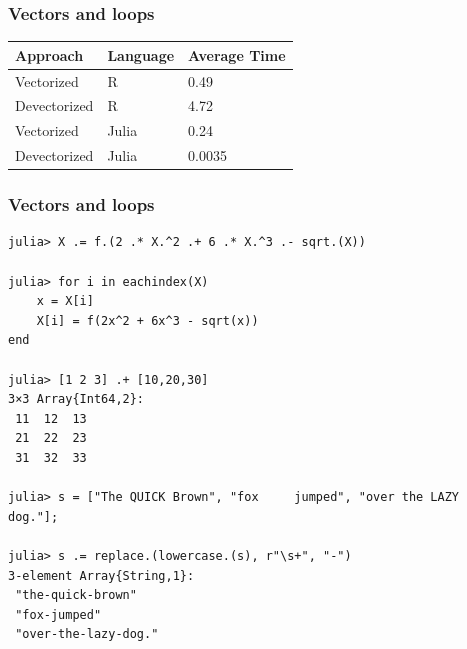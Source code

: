 \begin{frame}[fragile]
	\frametitle{Vectors and loops}
\begin{table}
\small
\begin{tabular}{*{3}{l}}
Approach & Language & Average Time \\
\hline
Vectorized & R & 0.49 \\
Devectorized & R & 4.72 \\
Vectorized & Julia & 0.24 \\
Devectorized & Julia & 0.0035 \\
\end{tabular}
\end{table}
\end{frame}

\begin{frame}[fragile]
	\frametitle{Vectors and loops}
  \begin{tiny}
  \begin{verbatim}
julia> X .= f.(2 .* X.^2 .+ 6 .* X.^3 .- sqrt.(X))

julia> for i in eachindex(X)
    x = X[i]
    X[i] = f(2x^2 + 6x^3 - sqrt(x))
end

julia> [1 2 3] .+ [10,20,30]
3×3 Array{Int64,2}:
 11  12  13
 21  22  23
 31  32  33

julia> s = ["The QUICK Brown", "fox     jumped", "over the LAZY dog."];

julia> s .= replace.(lowercase.(s), r"\s+", "-")
3-element Array{String,1}:
 "the-quick-brown"   
 "fox-jumped"        
 "over-the-lazy-dog."
  \end{verbatim}
  \end{tiny}
\end{frame}

